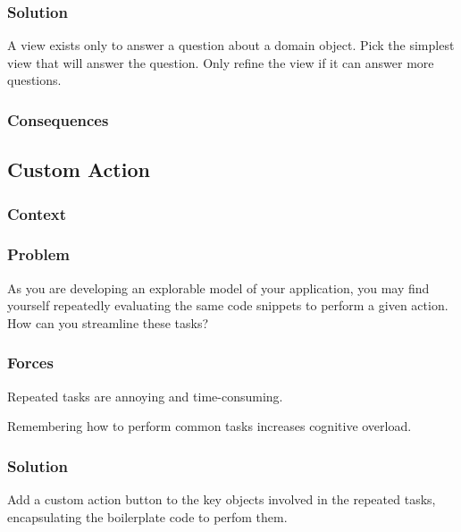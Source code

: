\documentclass[sigconf]{acmart}
\begin{document}
\subsubsection*{Solution}

A view exists only to answer a question about a domain object. Pick the simplest view that will answer the question. Only refine the view if it can answer more questions.


\subsubsection*{Consequences}

\subsection*{Custom Action}\label{pat:customAction}
\subsubsection*{Context}
\subsubsection*{Problem}

As you are developing an explorable model of your application, you may find yourself repeatedly evaluating the same code snippets to perform a given action. How can you streamline these tasks?

\subsubsection*{Forces}

Repeated tasks are annoying and time-consuming.

Remembering how to perform common tasks increases cognitive overload.

\subsubsection*{Solution}

Add a custom action button to the key objects involved in the repeated tasks, encapsulating the boilerplate code to perfom them.

\end{document}
